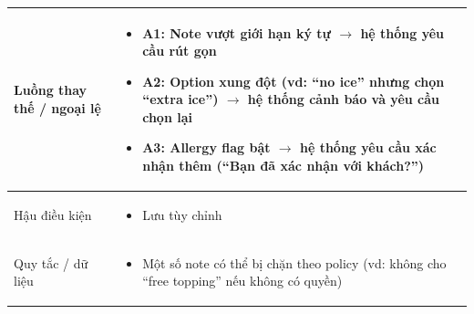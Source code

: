 \begin{longtable}{|>{\raggedright\arraybackslash}p{}|>{\raggedright\arraybackslash}p{}|}
\\
\hline
Luồng thay thế / ngoại lệ &
\vspace{-0.5em}
\begin{itemize}[leftmargin=*]
\item A1: Note vượt giới hạn ký tự $\rightarrow$ hệ thống yêu cầu rút gọn
\item A2: Option xung đột (vd: “no ice” nhưng chọn “extra ice”) $\rightarrow$ hệ thống cảnh báo và yêu cầu chọn lại
\item A3: Allergy flag bật $\rightarrow$ hệ thống yêu cầu xác nhận thêm (“Bạn đã xác nhận với khách?”)
\end{itemize}
\vspace{-0.5em}
\\
\hline
Hậu điều kiện &
\vspace{-0.5em}
\begin{itemize}[leftmargin=*]
\item Lưu tùy chỉnh
\end{itemize}
\vspace{-0.5em}
\\
\hline
Quy tắc / dữ liệu &
\vspace{-0.5em}
\begin{itemize}[leftmargin=*]
\item Một số note có thể bị chặn theo policy (vd: không cho “free topping” nếu không có quyền)
\end{itemize}
\vspace{-0.5em}
\\
\hline
\end{longtable}

